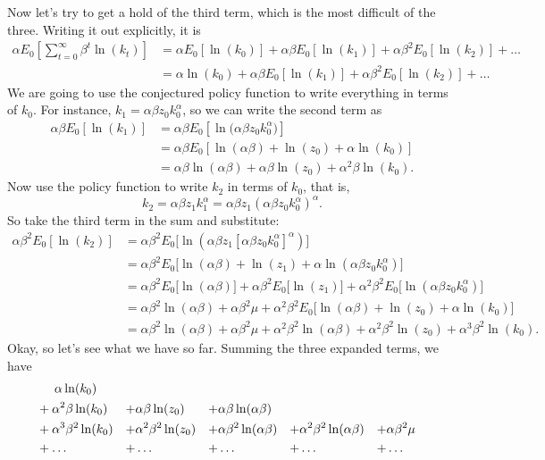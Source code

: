 \documentclass[12pt]{article}
\theoremstyle{definition}
\begin{document}
Now let's try to get a hold of the third term, which is the most difficult of the three. Writing it out explicitly, it is
\begin{align*}
 \alpha E_0 \left[ \sum_{t=0}^{\infty} \beta^t \ln(k_t) \right]
 	&= \alpha E_0[\ln(k_0)] + \alpha \beta E_0[\ln(k_1)] + \alpha \beta^2  E_0[\ln(k_2)] +  \hdots \\
 		&= \alpha \ln(k_0) +  \alpha \beta E_0[\ln(k_1)] + \alpha \beta^2  E_0[\ln(k_2)] +  \hdots
 \end{align*}
We are going to use the conjectured policy function to write everything in terms of $k_0$. For instance, $k_1= \alpha \beta z_0k_0^{\alpha}$, so we can write the second term as 
\begin{align*}
	\alpha \beta E_0[\ln(k_1)] &=  \alpha \beta E_0[\ln\big(\alpha \beta z_0k_0^{\alpha}\big)]\\
		&= \alpha \beta E_0[\ln(\alpha \beta) + \ln(z_0) + \alpha \ln(k_0)]\\
		&= \alpha \beta \ln(\alpha \beta) + \alpha \beta \ln(z_0) + \alpha^2 \beta \ln(k_0).
\end{align*}
Now use the policy function to write $k_2$ in terms of $k_0$, that is, 
\[k_2= \alpha \beta z_1k_1^{\alpha} = \alpha \beta z_1(\alpha \beta z_0k_0^{\alpha})^{\alpha}.	\]	
So take the third term in the sum and substitute:
\begin{align*}
	\alpha \beta^2  E_0[\ln(k_2)] &= 	\alpha \beta^2  E_0\big[\ln( \alpha \beta z_1[\alpha \beta z_0k_0^{\alpha}]^{\alpha})\big] \\
	&= 	\alpha \beta^2  E_0\big[\ln( \alpha \beta)+ \ln(z_1) + \alpha\ln(\alpha \beta z_0k_0^{\alpha})\big] \\
	&= 	\alpha \beta^2  E_0\big[\ln( \alpha \beta)\big]+ \alpha \beta^2E_0\big[\ln(z_1)\big] + \alpha^2 \beta^2E_0\big[\ln(\alpha \beta z_0k_0^{\alpha})\big] \\
	&= 	\alpha \beta^2 \ln( \alpha \beta)+ \alpha \beta^2\mu + \alpha^2 \beta^2E_0\big[\ln(\alpha \beta) + \ln( z_0) + \alpha \ln(k_0)\big] \\
	&= 	\alpha \beta^2 \ln( \alpha \beta)+ \alpha \beta^2\mu + \alpha^2 \beta^2\ln(\alpha \beta) + \alpha^2 \beta^2\ln( z_0) + \alpha^3 \beta^2 \ln(k_0).
\end{align*}
Okay, so let's see what we have so far. Summing the three expanded terms, we have
\begin{align*}
	&\hspace{.5cm} \alpha \ln(k_0) \\
	&+\alpha^2 \beta \ln(k_0) &+& \alpha \beta \ln(z_0)  &+& \alpha \beta \ln(\alpha \beta)   \\
	&+\alpha^3 \beta^2 \ln(k_0) &+& \alpha^2 \beta^2\ln( z_0) &+& \alpha \beta^2 \ln( \alpha \beta) &+&  \alpha^2 \beta^2\ln(\alpha \beta) &+& \alpha \beta^2\mu \\
	&+ \hdots &+& \hdots &+& \hdots &+& \hdots &+&\hdots
\end{align*}
\end{document}
